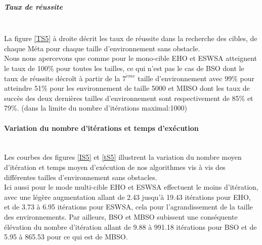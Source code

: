 \noindent
\begin{minipage}[t]{0.5\textwidth}
	\subparagraph{Taux de réussite}
	\textbf{}\\
	
	La figure \ref{TS5} à droite décrit les taux de réussite dans la recherche des cibles, de chaque Méta pour chaque taille d'environnement sans obstacle.\\
	Nous nous apercevons que comme pour le mono-cible EHO et ESWSA atteignent le taux de 100\% pour toutes les tailles, ce qui n'est pas le cas de BSO dont le taux de réussite décroît à partir de la $7^{\grave{e}me}$ taille d'environnement avec 99\% pour atteindre 51\% pour les environnement de taille 5000 et MBSO dont les taux de succès des deux dernières tailles d'environnement sont respectivement de 85\% et 79\%.
	(dans la limite du nombre d'itérations maximal:1000)
\end{minipage}\hfill
\begin{minipage}[t]{0.55\textwidth}
	\captionsetup{width=0.8\linewidth}
	\centering{}
	\label{TS5}
\end{minipage}\hfill





\noindent
	\paragraph{Variation du nombre d'itérations et temps d'exécution}
	\textbf{ }\\
	
	Les courbes des figures \ref{IS5} et \ref{tS5} illustrent la variation du nombre moyen d'itération et temps moyen d'exécution de nos algorithmes vis à vis des différentes tailles d'environnement sans obstacles.\\
	
	Ici aussi pour le mode multi-cible EHO et ESWSA effectuent le moins d'itération, avec une légère augmentation allant de 2.43 jusqu'à 19.43 itérations pour EHO, et de 3.73 à 6.95 itérations pour ESWSA, cela pour l'agrandissement de la taille des environnements.
	Par ailleurs, BSO et MBSO subissent une conséquente élévation du nombre d'itération allant de 9.88 à 991.18 itérations pour BSO et de 5.95 à 865.53 pour ce qui est de MBSO.\\
	
